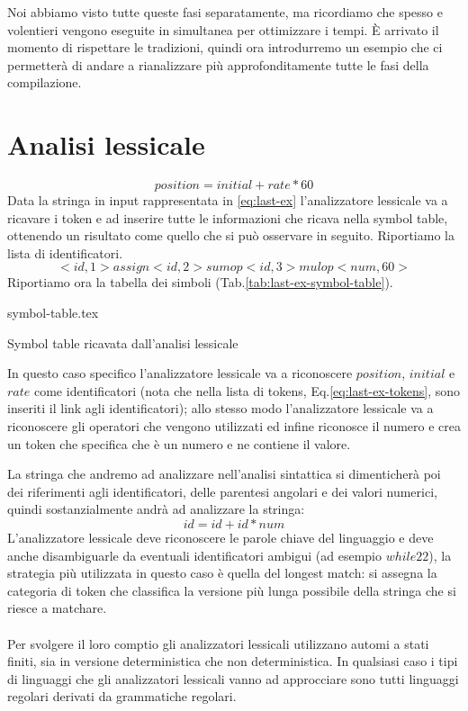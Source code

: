 \documentclass[class=book, crop=false, oneside, 12pt]{standalone}
\begin{document}
Noi abbiamo visto tutte queste fasi separatamente, ma ricordiamo che spesso e volentieri vengono eseguite in simultanea per ottimizzare i tempi.
È arrivato il momento di rispettare le tradizioni, quindi ora introdurremo un esempio che ci permetterà di andare a rianalizzare più approfonditamente tutte le fasi della compilazione.
\section{Analisi lessicale}
\begin{equation}
    \label{eq:last-ex}
    position = initial + rate * 60
\end{equation}
Data la stringa in input rappresentata in \ref{eq:last-ex} l'analizzatore lessicale va a ricavare i token e ad inserire tutte le informazioni che ricava nella symbol table, ottenendo un risultato come quello che si può osservare in seguito.
Riportiamo la lista di identificatori.
\begin{equation}
    \label{eq:last-ex-tokens}
    <id,1> assign <id,2> sumop <id, 3> mulop <num, 60>
\end{equation}
Riportiamo ora la tabella dei simboli (Tab.\ref{tab:last-ex-symbol-table}).
\begin{table}[H]
	\centering
	{symbol-table.tex}
    \caption{Symbol table ricavata dall'analisi lessicale}
    \label{tab:last-ex-symbol-table}
\end{table} 

In questo caso specifico l'analizzatore lessicale va a riconoscere \(position\), \(initial\) e \(rate\) come identificatori (nota che nella lista di tokens, Eq.\ref{eq:last-ex-tokens}, sono inseriti il link agli identificatori); allo stesso modo l'analizzatore lessicale va a riconoscere gli operatori che vengono utilizzati ed infine riconosce il numero e crea un token che specifica che è un numero e ne contiene il valore.

La stringa che andremo ad analizzare nell'analisi sintattica si dimenticherà poi dei riferimenti agli identificatori, delle parentesi angolari e dei valori numerici, quindi sostanzialmente andrà ad analizzare la stringa:
\begin{equation}
    id = id + id * num
\end{equation}
L'analizzatore lessicale deve riconoscere le parole chiave del linguaggio e deve anche disambiguarle da eventuali identificatori ambigui (ad esempio \(while22\)), la strategia più utilizzata in questo caso è quella del longest match: si assegna la categoria di token che classifica la versione più lunga possibile della stringa che si riesce a matchare.
\\\\
Per svolgere il loro comptio gli analizzatori lessicali utilizzano automi a stati finiti, sia in versione deterministica che non deterministica.
In qualsiasi caso i tipi di linguaggi che gli analizzatori lessicali vanno ad approcciare sono tutti linguaggi regolari derivati da grammatiche regolari.
\end{document}
